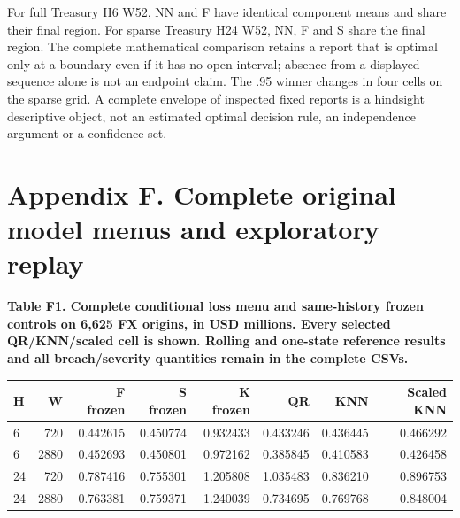 \documentclass[10pt,a4paper]{article}
\begin{document}
For full Treasury H6 W52, NN and F have identical component means and share their final region. For sparse Treasury H24 W52, NN, F and S share the final region. The complete mathematical comparison retains a report that is optimal only at a boundary even if it has no open interval; absence from a displayed sequence alone is not an endpoint claim. The .95 winner changes in four cells on the sparse grid. A complete envelope of inspected fixed reports is a hindsight descriptive object, not an estimated optimal decision rule, an independence argument or a confidence set.

\section*{Appendix F. Complete original model menus and exploratory replay}
\begin{center}
\begin{minipage}{\linewidth}
\small\textbf{Table F1. Complete conditional loss menu and same-history frozen controls on 6,625 FX origins, in USD millions. Every selected QR/KNN/scaled cell is shown. Rolling and one-state reference results and all breach/severity quantities remain in the complete CSVs.}\par\medskip
\centering\fontsize{8}{10}\selectfont
\begin{tabular}{lrrrrrrr}
\toprule
H & W & F frozen & S frozen & K frozen & QR & KNN & Scaled KNN \\
\midrule
6 & 720 & 0.442615 & 0.450774 & 0.932433 & 0.433246 & 0.436445 & 0.466292 \\
6 & 2880 & 0.452693 & 0.450801 & 0.972162 & 0.385845 & 0.410583 & 0.426458 \\
24 & 720 & 0.787416 & 0.755301 & 1.205808 & 1.035483 & 0.836210 & 0.896753 \\
24 & 2880 & 0.763381 & 0.759371 & 1.240039 & 0.734695 & 0.769768 & 0.848004 \\
\bottomrule
\end{tabular}
\end{minipage}
\end{center}
\end{document}
